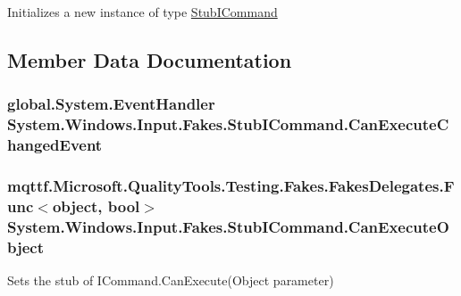 Initializes a new instance of type \hyperlink{class_system_1_1_windows_1_1_input_1_1_fakes_1_1_stub_i_command}{Stub\-I\-Command}



\subsection{Member Data Documentation}
\hypertarget{class_system_1_1_windows_1_1_input_1_1_fakes_1_1_stub_i_command_abf98b6077b32997426bb416dbaac8339}{
\subsubsection[{Can\-Execute\-Changed\-Event}]{\setlength{\rightskip}{0pt plus 5cm}global.\-System.\-Event\-Handler System.\-Windows.\-Input.\-Fakes.\-Stub\-I\-Command.\-Can\-Execute\-Changed\-Event}}\label{class_system_1_1_windows_1_1_input_1_1_fakes_1_1_stub_i_command_abf98b6077b32997426bb416dbaac8339}
\hypertarget{class_system_1_1_windows_1_1_input_1_1_fakes_1_1_stub_i_command_a0a6f78bc23f504b28ebec8f604162440}{
\subsubsection[{Can\-Execute\-Object}]{\setlength{\rightskip}{0pt plus 5cm}mqttf.\-Microsoft.\-Quality\-Tools.\-Testing.\-Fakes.\-Fakes\-Delegates.\-Func$<$object, bool$>$ System.\-Windows.\-Input.\-Fakes.\-Stub\-I\-Command.\-Can\-Execute\-Object}}\label{class_system_1_1_windows_1_1_input_1_1_fakes_1_1_stub_i_command_a0a6f78bc23f504b28ebec8f604162440}


Sets the stub of I\-Command.\-Can\-Execute(\-Object parameter)

